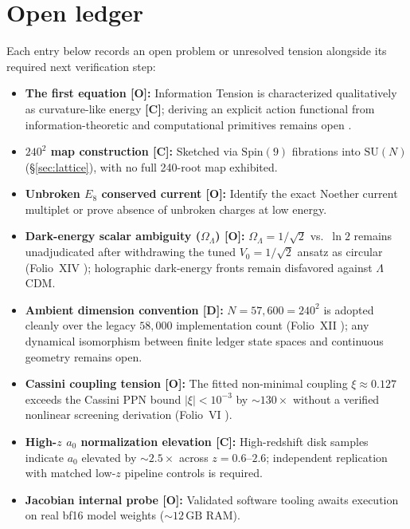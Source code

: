 \documentclass[11pt]{article}
\begin{document}
\section{Open ledger}
\label{sec:ledger}
Each entry below records an open problem or unresolved tension alongside its required next verification step:
\begin{itemize}
\item \textbf{The first equation [O]:} Information Tension is characterized qualitatively as curvature-like energy \textbf{[C]}; deriving an explicit action functional from information-theoretic and computational primitives remains open \cite{res-nova-repo}.
\item \textbf{$240^2$ map construction [C]:} Sketched via $\mathrm{Spin}(9)$ fibrations into $\mathrm{SU}(N)$ (\S\ref{sec:lattice}), with no full 240-root map exhibited.
\item \textbf{Unbroken $E_8$ conserved current [O]:} Identify the exact Noether current multiplet or prove absence of unbroken charges at low energy.
\item \textbf{Dark-energy scalar ambiguity ($\Omega_\Lambda$) [O]:} $\Omega_\Lambda = 1/\sqrt{2}$ vs.\ $\ln 2$ remains unadjudicated after withdrawing the tuned $V_0 = 1/\sqrt{2}$ ansatz as circular (Folio~XIV \cite{folio-xiv}); holographic dark-energy fronts remain disfavored against $\Lambda$CDM.
\item \textbf{Ambient dimension convention [D]:} $N = 57{,}600 = 240^2$ is adopted cleanly over the legacy $58{,}000$ implementation count (Folio~XII \cite{folio-xii}); any dynamical isomorphism between finite ledger state spaces and continuous geometry remains open.
\item \textbf{Cassini coupling tension [O]:} The fitted non-minimal coupling $\xi \approx 0.127$ exceeds the Cassini PPN bound $|\xi| < 10^{-3}$ by $\sim 130\times$ without a verified nonlinear screening derivation (Folio~VI \cite{folio-vi}).
\item \textbf{High-$z$ $a_0$ normalization elevation [C]:} High-redshift disk samples indicate $a_0$ elevated by $\sim 2.5\times$ across $z = 0.6$--$2.6$; independent replication with matched low-$z$ pipeline controls is required.
\item \textbf{Jacobian internal probe [O]:} Validated software tooling awaits execution on real bf16 model weights ($\sim 12\,\mathrm{GB}$ RAM).
\end{itemize}

\appendix
\end{document}
